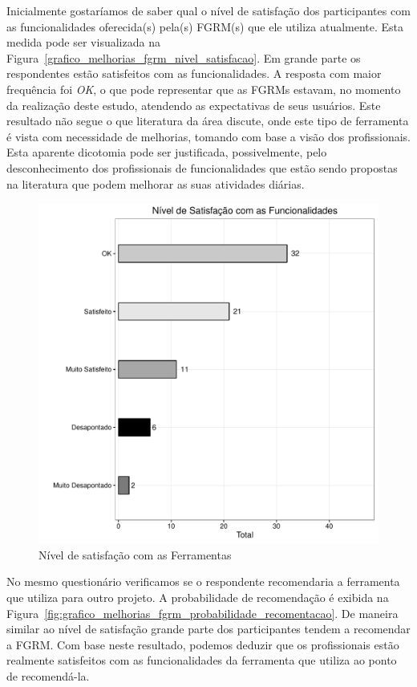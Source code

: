 Inicialmente gostaríamos de saber qual o nível de satisfação dos participantes
com as funcionalidades oferecida(s) pela(s) FGRM(s) que ele utiliza atualmente.
Esta medida pode ser visualizada na
Figura~\ref{grafico_melhorias_fgrm_nivel_satisfacao}. Em grande parte os
respondentes estão satisfeitos com as funcionalidades. A resposta com maior
frequência foi \textit{OK}, o que pode representar que as FGRMs estavam, no
momento da realização deste estudo, atendendo as expectativas de seus usuários.
Este resultado não segue o que literatura da área discute, onde este tipo de
ferramenta é vista com necessidade de melhorias, tomando com base a visão dos
profissionais. Esta aparente dicotomia pode ser justificada, possivelmente, pelo
desconhecimento dos profissionais de funcionalidades que estão sendo propostas
na literatura que podem melhorar as suas atividades diárias.

\begin{figure}[htpb]
	\centering
	\includegraphics[width=0.8\linewidth]{./chapter-pesquisa-com-profissionais/img/grafico_melhorias_fgrm_nivel_satisfacao.pdf}
	\caption{Nível de satisfação com as Ferramentas}
\label{fig:grafico_melhorias_fgrm_nivel_satisfacao}
\end{figure}

No mesmo questionário verificamos se o respondente recomendaria a ferramenta que
utiliza para outro projeto. A probabilidade de recomendação é exibida na
Figura~\ref{fig:grafico_melhorias_fgrm_probabilidade_recomentacao}. De maneira
similar ao nível de satisfação grande parte dos participantes tendem a
recomendar a FGRM. Com base neste resultado, podemos deduzir que os
profissionais estão realmente satisfeitos com as funcionalidades da ferramenta
que utiliza ao ponto de recomendá-la.

